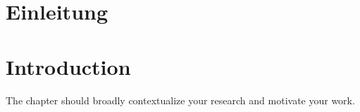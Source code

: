 {\chapter{Einleitung}}
{\chapter{Introduction}}

\label{sec:introduction}
The chapter should broadly contextualize your research and motivate your work.





